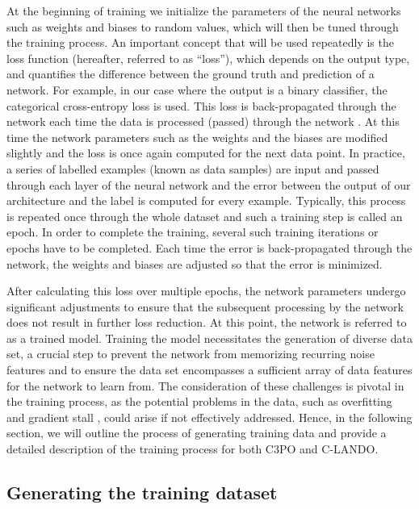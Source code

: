\documentclass[referee]{aa} %
\begin{document}
At the beginning of training we initialize the parameters of the neural networks such as weights and biases to random values, which will then be tuned through the training process. %
An important concept that will be used repeatedly is the loss function (hereafter, referred to as ``loss''), which depends on the output type, and quantifies the difference between the ground truth and prediction of a network.
For example, in our case where the output is a binary classifier, the categorical cross-entropy loss is used.
This loss is back-propagated through the network each time the data is processed (passed) through the network \citep{Rojas1996}.
At this time the network parameters such as the weights and the biases are modified slightly and the loss is once again computed for the next data point.
In practice, a series of labelled examples (known as data samples) are input and passed through each layer of the neural network and the error between the output of our architecture and the label is computed for every example.
Typically, this process is repeated once through the whole dataset and such a training step is called an epoch.
In order to complete the training, several such training iterations or epochs have to be completed.
Each time the error is back-propagated through the network, the weights and biases are adjusted so that the error is minimized.

After calculating this loss over multiple epochs, the network parameters undergo significant adjustments to ensure that the subsequent processing by the network does not result in further loss reduction. At this point, the network is referred to as a trained model.
Training the model necessitates the generation of diverse data set, a crucial step to prevent the network from memorizing recurring noise features and to ensure the data set encompasses a sufficient array of data features for the network to learn from. The consideration of these challenges is pivotal in the training process, as the potential problems in the data, such as overfitting \citep[][]{dietterich1995overfitting} and gradient stall \citep[][]{patel2017sgd}, could arise if not effectively addressed.
Hence, in the following section, we will outline the process of generating training data and provide a detailed description of the training process for both C3PO and C-LANDO.
\subsection{Generating the training dataset}
\end{document}
